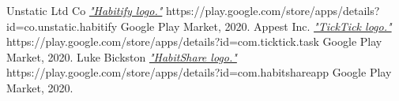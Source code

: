 \documentclass[twoside]{ctuthesis}
\begin{document}
\begin{thebibliography}{99}
         Unstatic Ltd Co \href{https://play.google.com/store/apps/details?id=co.unstatic.habitify}{\emph{"Habitify logo."}} https://play.google.com/store/apps/details?id=co.unstatic.habitify Google Play Market, 2020.
         Appest Inc. \href{https://play.google.com/store/apps/details?id=com.ticktick.task}{\emph{"TickTick logo."}} https://play.google.com/store/apps/details?id=com.ticktick.task Google Play Market, 2020.
         Luke Bickston \href{https://play.google.com/store/apps/details?id=com.habitshareapp}{\emph{"HabitShare logo."}} https://play.google.com/store/apps/details?id=com.habitshareapp Google Play Market, 2020.
    \end{thebibliography}
\end{document}
